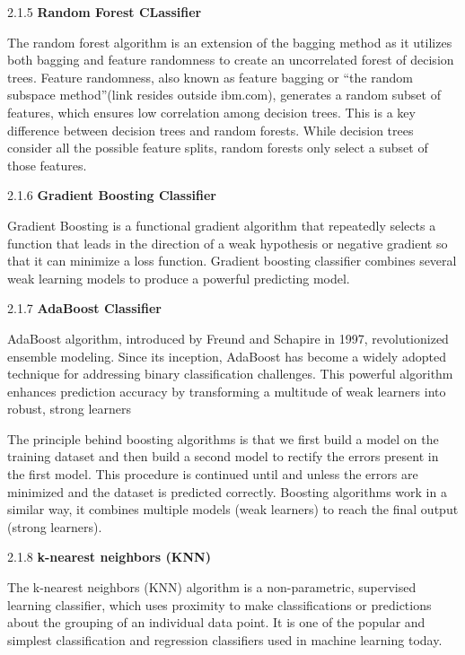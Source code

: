 \documentclass[a4paper]{article}
\theoremstyle{plain}
\theoremstyle{definition}
\begin{document}
2.1.5 \textbf{Random Forest CLassifier\newline}

The random forest algorithm is an extension of the bagging method as it utilizes both bagging and feature randomness to create an uncorrelated forest of decision trees. Feature randomness, also known as feature bagging or “the random subspace method”(link resides outside ibm.com), generates a random subset of features, which ensures low correlation among decision trees. This is a key difference between decision trees and random forests. While decision trees consider all the possible feature splits, random forests only select a subset of those features.\newline

2.1.6 \textbf{Gradient Boosting Classifier\newline}

Gradient Boosting is a functional gradient algorithm that repeatedly selects a function that leads in the direction of a weak hypothesis or negative gradient so that it can minimize a loss function. Gradient boosting classifier combines several weak learning models to produce a powerful predicting model.\newline

2.1.7\textbf{ AdaBoost Classifier\newline}

AdaBoost algorithm, introduced by Freund and Schapire in 1997, revolutionized ensemble modeling. Since its inception, AdaBoost has become a widely adopted technique for addressing binary classification challenges. This powerful algorithm enhances prediction accuracy by transforming a multitude of weak learners into robust, strong learners

The principle behind boosting algorithms is that we first build a model on the training dataset and then build a second model to rectify the errors present in the first model. This procedure is continued until and unless the errors are minimized and the dataset is predicted correctly. Boosting algorithms work in a similar way, it combines multiple models (weak learners) to reach the final output (strong learners).\newline

2.1.8\textbf{ k-nearest neighbors (KNN)\newline}

The k-nearest neighbors (KNN) algorithm is a non-parametric, supervised learning classifier, which uses proximity to make classifications or predictions about the grouping of an individual data point. It is one of the popular and simplest classification and regression classifiers used in machine learning today.
\end{document}
